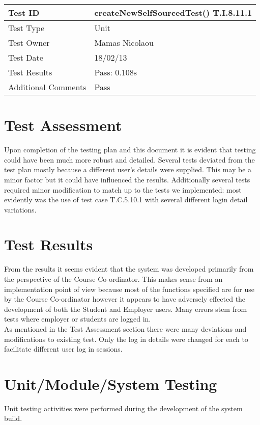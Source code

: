 \documentclass{l3deliverable}
\begin{document}
\vspace{4 mm}

\begin{tabular}{|p{2cm}|p{12cm}|}
\hline
Test ID & createNewSelfSourcedTest() T.I.8.11.1\\
\hline
Test Type & Unit\\
\hline
Test Owner  & Mamas Nicolaou\\
\hline
Test Date & 18/02/13\\
\hline
Test Results & Pass: 0.108s\\
\hline
Additional Comments & Pass\\
\hline
\end{tabular}

\section{Test Assessment}
Upon completion of the testing plan and this document it is evident that testing could have been much more robust and detailed. Several tests deviated from the test plan mostly because a different user's details were supplied. This may be a minor factor but it could have influenced the results. Additionally several tests required minor modification to match up to the tests we implemented: most evidently was the use of test case T.C.5.10.1 with several different login detail variations.

\section{Test Results}
From the results it seems evident that the system was developed primarily from the perspective of the Course Co-ordinator. This makes sense from an implementation point of view because most of the functions specified are for use by the Course Co-ordinator however it appears to have adversely effected the development of both the Student and Employer users. Many errors stem from tests where employer or students are logged in.\\
As mentioned in the Test Assessment section there were many deviations and modifications to existing test. Only the log in details were changed for each to facilitate different user log in sessions. 

\section{Unit/Module/System Testing}
Unit testing activities were performed during the development of the system build.
\end{document}
